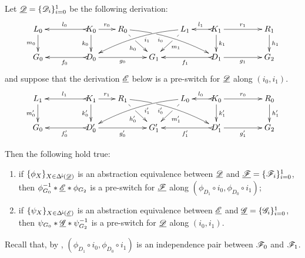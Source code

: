 \begin{lemma}\label{lem:abs}
	Let $\underline{\mathscr{D}}=\{\mathscr{D}_i\}_{i=0}^1$ be the following derivation:
	\[\xymatrix@R=20pt@C=20pt{L_0 \ar[d]_{m_0}&& K_0
		\ar[d]_{k_0}\ar@{>->}[ll]_{l_0} \ar[r]^{r_0} & R_0
		\ar@{>}@/^.25cm/[drrr]|(.32)\hole_(.4){i_0}
		\ar[dr]|(.33)\hole_{h_0} && L_1 \ar@{>}@/_.25cm/[dlll]^(.4){i_1}
		\ar[dl]|(.33)\hole^{m_1}& K_1 \ar[d]^{k_1}\ar@{>->}[l]_{l_1}
		\ar[rr]^{r_1} && R_1 \ar[d]^{h_1}\\G_0 && \ar@{>->}[ll]^{f_0}
		D_0 \ar[rr]_{g_0}&& G_1 && \ar@{>->}[ll]^{f_1} D_1
		\ar[rr]_{g_1}&& G_2}
	\]
	and suppose that the derivation $\underline{\mathscr{E}}$ below is a pre-switch for $\underline{\mathscr{D}}$ along $(i_0,i_1)$.
	\[
	\xymatrix@R=20pt@C=20pt{
		{L_1} \ar[d]_{m_0'}
		&&  {K_1} \ar@{>->}[ll]_{l_1} \ar[r]^{r_1} \ar[d]_{k_0'}
		&  {R_1} \ar[dr]|(.33)\hole_{h_0'}  \ar@/^.25cm/@{>}_(.4){i_0'}|(.32)\hole[drrr]
		& & 
		{L_0}\ar[dl]|(.33)\hole^{m_1'} \ar@/_.25cm/@{>}^(.4){i_1'}[dlll] 
		&  {K_0} \ar@{>->}[l]_{l_0} \ar[rr]^{r_0} \ar[d]^{k_1'}
		& & {R_0} \ar[d]^{h_1'} \\		
		{G_0}
		& & {D_0'} \ar@{>->}[ll]^{f_0'} \ar[rr]_{g_0'}
		& &  {G'_1} 
		& &  {D_1'} \ar@{>->}[ll]^{f_1'} \ar[rr]_{g_1'}
		& & {G_2}  }
	\]
	
	Then the following hold true:
	\begin{enumerate}
		\item if $\{\phi_X\}_{X\in \Delta^{\hspace{-1pt}\downarrow\hspace{-1pt}}(\underline{\mathscr{D}})}$ is an abstraction equivalence between $\underline{\mathscr{D}}$ and $\underline{\mathscr{F}}=\{\mathscr{F}_i\}_{i=0}^1$, then $\phi^{-1}_{G_0}*\underline{\mathscr{E}}*\phi_{G_2}$ is a pre-switch for $\underline{\mathscr{F}}$ along $(\phi_{D_1}\circ i_0, \phi_{D_0}\circ i_1 )$;
		\item if $\{\psi_X\}_{X\in \Delta^{\hspace{-1pt}\downarrow\hspace{-1pt}}(\underline{\mathscr{E}})}$ is an abstraction equivalence between $\underline{\mathscr{E}}$ and $\underline{\mathscr{G}}=\{\mathscr{G}_{i}\}_{i=0}^1$, then $\psi_{G_0}*\underline{\mathscr{G}}*\psi^{-1}_{G_2}$ is a pre-switch for $\underline{\mathscr{D}}$ along $(i_0, i_1)$.
	\end{enumerate}
	\begin{remark}Recall that, by , $(\phi_{D_1}\circ i_0, \phi_{D_0}\circ i_1 )$ is an independence pair between $\mathscr{F}_0$ and $\mathscr{F}_1$.
	\end{remark}
\end{lemma}
